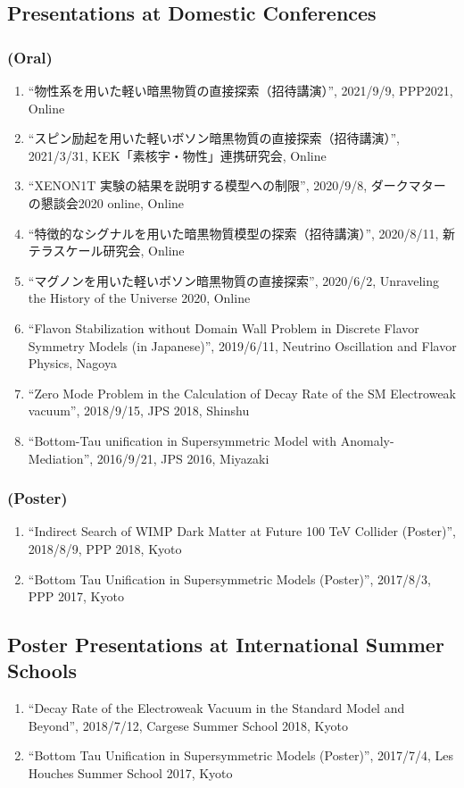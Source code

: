 \documentclass[12pt]{article}
\begin{document}
\subsection*{Presentations at Domestic Conferences}
\subsubsection*{(Oral)}
\begin{enumerate}
 \item ``物性系を用いた軽い暗黒物質の直接探索（招待講演）'', 2021/9/9, PPP2021, Online
 \item ``スピン励起を用いた軽いボソン暗黒物質の直接探索（招待講演）'', 2021/3/31, KEK「素核宇・物性」連携研究会, Online
 \item ``XENON1T 実験の結果を説明する模型への制限'', 2020/9/8, ダークマターの懇談会2020 online, Online
 \item ``特徴的なシグナルを用いた暗黒物質模型の探索（招待講演）'', 2020/8/11, 新テラスケール研究会, Online
 \item ``マグノンを用いた軽いボソン暗黒物質の直接探索'', 2020/6/2, Unraveling the History of the Universe 2020, Online
 \item ``Flavon Stabilization without Domain Wall Problem in Discrete Flavor Symmetry Models (in Japanese)'', 2019/6/11, Neutrino Oscillation and Flavor Physics, Nagoya
 \item ``Zero Mode Problem in the Calculation of Decay Rate of the SM Electroweak vacuum'', 2018/9/15, JPS 2018, Shinshu
 \item ``Bottom-Tau unification in Supersymmetric Model with Anomaly-Mediation'', 2016/9/21, JPS 2016, Miyazaki
\end{enumerate}
\subsubsection*{(Poster)}
\begin{enumerate}
 \item ``Indirect Search of WIMP Dark Matter at Future 100 TeV Collider (Poster)'', 2018/8/9, PPP 2018, Kyoto
 \item ``Bottom Tau Unification in Supersymmetric Models (Poster)'', 2017/8/3, PPP 2017, Kyoto
\end{enumerate}

\subsection*{Poster Presentations at International Summer Schools}
\begin{enumerate}
 \item ``Decay Rate of the Electroweak Vacuum in the Standard Model and Beyond'', 2018/7/12, Cargese Summer School 2018, Kyoto
 \item ``Bottom Tau Unification in Supersymmetric Models (Poster)'', 2017/7/4, Les Houches Summer School 2017, Kyoto
\end{enumerate}
\end{document}
